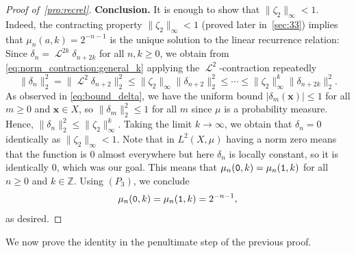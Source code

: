 \documentclass[12pt,reqno]{article}
\DeclareMathOperator{\Lop}{\mathcal{L}}
\newcommand{\Z}{\mathbb{Z}}
\begin{document}
\begin{proof}[Proof of~\cref{pro:recrel}]
{\bf Conclusion.} It is enough to show that $\|\zeta_2\|_\infty < 1$. Indeed, the contracting property $\|\zeta_2\|_\infty < 1$ (proved later in~\cref{sec:33}) implies that $\mu_n(a,k) = 2^{-n-1}$ is the unique solution to the linear recurrence relation: Since $\delta_n = \Lop^{2k}\delta_{n+2k}$ for all $n,k \ge 0$,  we obtain from  \eqref{eq:norm_contraction:general_k} applying the $\Lop^2$-contraction repeatedly
\[
    \|\delta_n\|_2^2
    = \|\Lop^2\delta_{n+2}\|_2^2
    \le \|\zeta_2\|_\infty \|\delta_{n+2}\|_2^2
    \le \dotsb \le \|\zeta_2\|_\infty^k \|\delta_{n+2k}\|_2^2.
\]
As observed in \eqref{eq:bound_delta}, we have the uniform bound $|\delta_m(\mathbf{x})|\le1$ for all $m \ge 0$ and $\mathbf{x} \in X$, so $\|\delta_m\|_2^2 \le 1$ for all $m$ since $\mu$ is a probability measure.
Hence, $\|\delta_n\|_2^2 \le \|\zeta_2\|_\infty^k$.
Taking the limit $k \to \infty$, we obtain that $\delta_n = 0$ identically as $\|\zeta_2\|_\infty < 1$.
Note that in $L^2(X,\mu)$ having a norm zero means that the function is $0$ almost everywhere but here $\delta_n$ is locally constant, so it is identically $0$, which was our goal. This means that $\mu_n({\tt 0},k) = \mu_n({\tt 1},k)$ for all $n \ge 0$ and $k \in \Z$. Using $(P_3)$, we conclude
\[
    \mu_n({\tt 0},k)=\mu_n({\tt 1},k)=2^{-n-1},
\]
as desired.
\end{proof}

We now prove the identity in the penultimate step of the previous proof.
\end{document}
